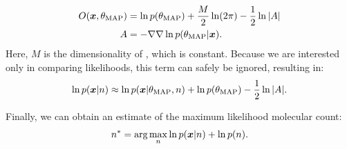   \begin{align*}
    O(\bm{x}, \theta_\text{MAP}) &=
      \ln p(\theta_\text{MAP}) +
      \frac{M}{2} \ln(2\pi) -
      \frac{1}{2} \ln |A|
    \\
    A &=
      -\nabla \nabla \ln p(\theta_\text{MAP} | \bm{x})
    \text{.}
  \end{align*}
  Here, $M$ is the dimensionality of \parameters, which is constant.
  Because we are interested only in comparing likelihoods, this term can safely
  be ignored, resulting in:
  \begin{equation}
    \ln p(\bm{x} | n) \approx
      \ln p(\bm{x} | \theta_\text{MAP}, n) +
      \ln p(\theta_\text{MAP}) -
      \frac{1}{2} \ln |A|
    \text{.}
    \label{eq:method:evidence}
  \end{equation}

Finally, we can obtain an estimate of the maximum likelihood molecular count:
  \begin{equation}
      n^* =
      \text{arg}\max_{n}
        \ln p(\bm{x} | n) + \ln p(n)
    \text{.}
    \label{eq:method:optimization}
  \end{equation}
